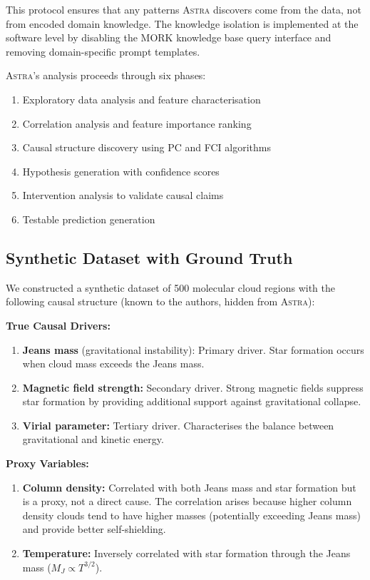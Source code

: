 \documentclass[fleqn,usenatbib]{mnras}
\newcommand{\astra}{\textsc{Astra}\xspace}
\newcommand{\pc}{PC\xspace}
\newcommand{\fci}{FCI\xspace}
\begin{document}
This protocol ensures that any patterns \astra discovers come from the data, not from encoded domain knowledge.
The knowledge isolation is implemented at the software level by disabling the MORK knowledge base query interface and removing domain-specific prompt templates.

\astra's analysis proceeds through six phases:
\begin{enumerate}
  \item[(i)] Exploratory data analysis and feature characterisation
  \item[(ii)] Correlation analysis and feature importance ranking
  \item[(iii)] Causal structure discovery using \pc and \fci algorithms
  \item[(iv)] Hypothesis generation with confidence scores
  \item[(v)] Intervention analysis to validate causal claims
  \item[(vi)] Testable prediction generation
\end{enumerate}

\subsection{Synthetic Dataset with Ground Truth}
\label{sec:tc6:dataset}

We constructed a synthetic dataset of 500 molecular cloud regions with the following causal structure (known to the authors, hidden from \astra):

\textbf{True Causal Drivers:}
\begin{enumerate}
  \item[(i)] \textbf{Jeans mass} (gravitational instability): Primary driver. Star formation occurs when cloud mass exceeds the Jeans mass.
  \item[(ii)] \textbf{Magnetic field strength:} Secondary driver. Strong magnetic fields suppress star formation by providing additional support against gravitational collapse.
  \item[(iii)] \textbf{Virial parameter:} Tertiary driver. Characterises the balance between gravitational and kinetic energy.
\end{enumerate}

\textbf{Proxy Variables:}
\begin{enumerate}
  \item[(i)] \textbf{Column density:} Correlated with both Jeans mass and star formation but is a proxy, not a direct cause. The correlation arises because higher column density clouds tend to have higher masses (potentially exceeding Jeans mass) and provide better self-shielding.
  \item[(ii)] \textbf{Temperature:} Inversely correlated with star formation through the Jeans mass ($M_J \propto T^{3/2}$).
\end{enumerate}
\end{document}
